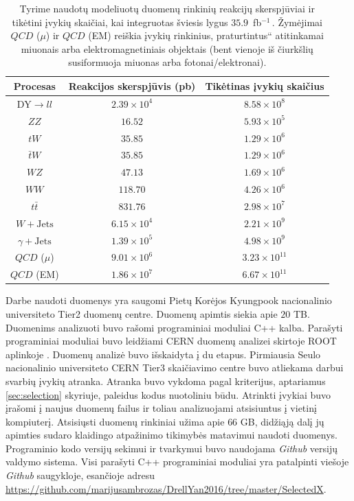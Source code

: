 \documentclass[a4paper, 12pt, oneside]{article}
\newcommand{\ZZ}{Z\! Z}
\newcommand{\WZ}{W\! Z}
\newcommand{\tbarW}{\bar{t}W}
\newcommand{\ttbar}{t\bar{t}}
\newcommand{\gJets}{\gamma\! +\!\mathrm{Jets}}
\newcommand{\WJets}{W\! +\!\mathrm{Jets}}
\newcommand{\ltq}[1]{{\quotedblbase{}#1\textquotedblleft{}}}
\newcommand{\invfb}{fb$^{-1}\,$}
\newcommand{\QCD}{QC\! D}
\newlength\q
\begin{document}
\begin{table}[b!]
	\begin{tabular}{|c|c|c|}
		\hline
		Procesas & Reakcijos skerspjūvis (pb) & Tikėtinas įvykių skaičius \\ 
		\hline\hline
		$\mathrm{DY} \!\!\rightarrow\! ll$ & $2.39\times 10^4$ & $8.58\times 10^8$ \\ %
		\hline		
		$\ZZ$ & $16.52$ & $5.93\times 10^5$ \\
		\hline
		$tW$ & $35.85$ & $1.29\times 10^6$ \\
		\hline
		$\tbarW$ & $35.85$ & $1.29\times 10^6$ \\
		\hline
		$\WZ$ & $47.13$ & $1.69\times 10^6$ \\
		\hline
		$WW$ & $118.70$ & $4.26\times 10^6$ \\
		\hline	
		$\ttbar$ & $831.76$ & $2.98\times 10^7$ \\
		\hline	
		$\WJets$ & $6.15\times 10^4$ & $2.21\times 10^9$ \\ %
		\hline
		$\gJets$ & $1.39 \times 10^5$ & $4.98\times 10^9$ \\
		\hline
		$\QCD$ ($\mu$) & $9.01\times 10^6$ & $3.23\times 10^{11}$ \\
		\hline
		$\QCD$ (EM) & $1.86\times 10^7$ & $6.67\times 10^{11}$ \\
		\hline
	\end{tabular}
	\caption{\label{table:Xsec} Tyrime naudotų modeliuotų duomenų rinkinių reakcijų skerspjūviai ir tikėtini įvykių skaičiai, kai integruotas
	šviesis lygus $35.9$~\invfb. Žymėjimai $\QCD$ ($\mu$) ir $\QCD$ (EM) reiškia įvykių rinkinius, \ltq{praturtintus}
	atitinkamai miuonais arba elektromagnetiniais objektais (bent vienoje iš čiurkšlių susiformuoja miuonas arba fotonai/elektronai).}
\end{table}

Darbe naudoti duomenys yra saugomi Pietų Korėjos Kyungpook nacionalinio universiteto Tier2 duomenų centre.
Duomenų apimtis siekia apie $20$ TB.
Duomenims analizuoti buvo rašomi programiniai moduliai C++ kalba.
Parašyti programiniai moduliai buvo leidžiami CERN duomenų analizei skirtoje ROOT aplinkoje \cite{ROOTarticle}.
Duomenų analizė buvo išskaidyta į du etapus.
Pirmiausia Seulo nacionalinio universiteto CERN Tier3 skaičiavimo centre buvo atliekama darbui svarbių įvykių atranka.
Atranka buvo vykdoma pagal kriterijus, aptariamus \ref{sec:selection} skyriuje, paleidus kodus nuotoliniu būdu.
Atrinkti įvykiai buvo įrašomi į naujus duomenų failus ir toliau analizuojami atsisiuntus į vietinį kompiuterį.
Atsisiųsti duomenų rinkiniai užima apie $66$ GB, didžiąją dalį jų apimties sudaro klaidingo atpažinimo tikimybės matavimui
naudoti duomenys.
Programinio kodo versijų sekimui ir tvarkymui buvo naudojama \textit{Github} versijų valdymo sistema.
Visi parašyti C++ programiniai moduliai yra patalpinti viešoje \textit{Github} saugykloje, esančioje adresu
\url{https://github.com/marijusambrozas/DrellYan2016/tree/master/SelectedX}.
\end{document}
